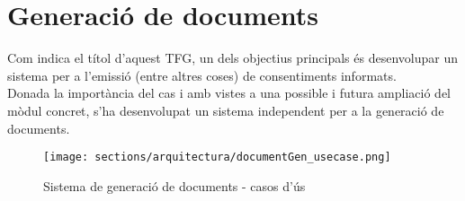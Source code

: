 \section{Generació de documents}
\label{arquitectura:generacio_documents}
Com indica el títol d'aquest TFG, un dels objectius principals és desenvolupar un sistema per a l'emissió (entre altres coses) de consentiments informats.\\
\newline Donada la importància del cas i amb vistes a una possible i futura ampliació del mòdul concret, s'ha desenvolupat un sistema independent per a la generació de documents.\\
\begin{figure}[h]
\texttt{[image: sections/arquitectura/documentGen\_usecase.png]}
\centering
\caption{Sistema de generació de documents - casos d'ús}
\label{fig:pdfgentool_usecase}
\end{figure}
